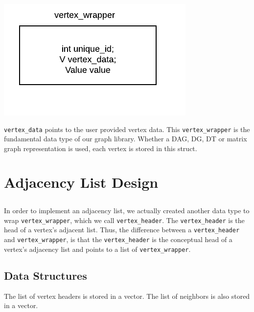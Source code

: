 \documentclass{article}
\begin{document}
\includegraphics{vertexwrapper}

\texttt{vertex\_data} points to the user provided vertex data. This \texttt{vertex\_wrapper} is the fundamental data type of our graph library. Whether a DAG, DG, DT or matrix graph representation is used, each vertex is stored in this struct. 

\section{Adjacency List Design}
\subsection{}
In order to implement an adjacency list, we actually created another data type to wrap \texttt{vertex\_wrapper}, which we call \texttt{vertex\_header}. The \texttt{vertex\_header} is the head of a vertex's adjacent list. Thus, the difference between a \texttt{vertex\_header} and \texttt{vertex\_wrapper}, is that the \texttt{vertex\_header} is the conceptual head of a vertex's adjacency list and points to a list of  \texttt{vertex\_wrapper}.

\subsection{Data Structures}
The list of vertex headers is stored in a vector. The list of neighbors is also stored in a vector.
\end{document}

